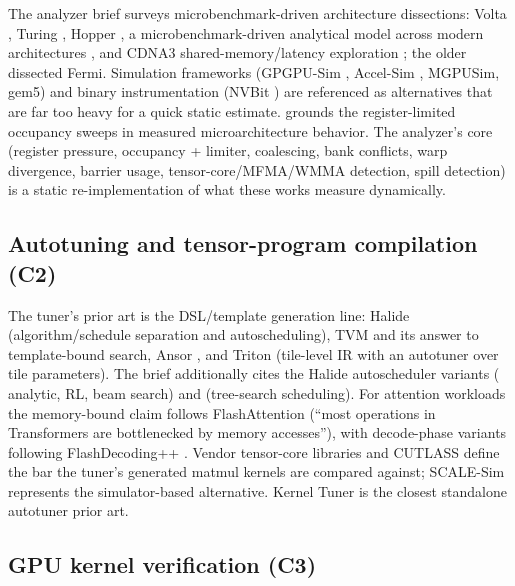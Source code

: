 \documentclass[10pt]{article}
\newcommand{\kst}[1]{\texttt{\detokenize{#1}}}
\begin{document}
The analyzer brief surveys microbenchmark-driven architecture dissections: Volta
\citep{volta2018}, Turing \citep{turing2019}, Hopper \citep{hopper2024}, a
microbenchmark-driven analytical model across modern architectures \citep{model26}, and
CDNA3 shared-memory/latency exploration \citep{mall25}; the older
\citet{microbenchmark2010} dissected Fermi. Simulation frameworks (GPGPU-Sim
\citep{gpgpusim2009}, Accel-Sim \citep{accelsim2020}, MGPUSim, gem5) and binary
instrumentation (NVBit \citep{nvbit2019}) are referenced as alternatives that are far too
heavy for a quick static estimate. \citet{baremetal2017} grounds the register-limited
occupancy sweeps in measured microarchitecture behavior. The analyzer's core (register
pressure, occupancy + limiter, coalescing, bank conflicts, warp divergence, barrier
usage, tensor-core/MFMA/WMMA detection, spill detection) is a static re-implementation
of what these works measure dynamically.

\subsection{Autotuning and tensor-program compilation (C2)}

The tuner's prior art is the DSL/template generation line: Halide
\citep{halide2013} (algorithm/schedule separation and autoscheduling), TVM
\citep{tvm2018} and its answer to template-bound search, Ansor \citep{ansor2020},
and Triton \citep{triton2019} (tile-level IR with an autotuner over tile
parameters). The brief additionally cites the Halide autoscheduler variants
(\kst{mullapudi2016} analytic, \kst{li2018} RL, \kst{anderson2021} beam search)
and \citet{adamshalide2019} (tree-search scheduling). For attention workloads the
memory-bound claim follows FlashAttention \citep{flashattention2022} (``most operations in
Transformers are bottlenecked by memory accesses''), with decode-phase variants
following FlashDecoding++ \citep{flashdecoding2024}. Vendor tensor-core libraries
\citep{cublas,cudnn} and CUTLASS \citep{cutlass} define the bar the tuner's generated
matmul kernels are compared against; SCALE-Sim \citep{scalesim2019} represents the
simulator-based alternative. Kernel Tuner \citep{kerneltuner2024} is the closest
standalone autotuner prior art.

\subsection{GPU kernel verification (C3)}
\end{document}
